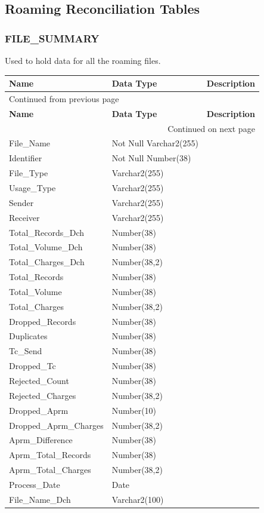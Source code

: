 \documentclass[12pt,twoside]{article}
\begin{document}
\normalsize

\subsection{Roaming Reconciliation Tables}
\label{sec:orgheadline161}
\subsubsection{FILE\_SUMMARY}
\label{sec:orgheadline158}
Used to hold data for all the roaming files.
\footnotesize
\begin{longtable}{l|l|l}
\hline
\textbf{Name} & \textbf{Data Type} & \textbf{Description}\\
\hline
\endfirsthead
\multicolumn{3}{l}{Continued from previous page} \\
\hline

\textbf{Name} & \textbf{Data Type} & \textbf{Description} \\

\hline
\endhead
\hline\multicolumn{3}{r}{Continued on next page} \\
\endfoot
\endlastfoot
\hline
File\_Name & Not Null Varchar2(255) & \\
Identifier & Not Null Number(38) & \\
File\_Type & Varchar2(255) & \\
Usage\_Type & Varchar2(255) & \\
Sender & Varchar2(255) & \\
Receiver & Varchar2(255) & \\
Total\_Records\_Dch & Number(38) & \\
Total\_Volume\_Dch & Number(38) & \\
Total\_Charges\_Dch & Number(38,2) & \\
Total\_Records & Number(38) & \\
Total\_Volume & Number(38) & \\
Total\_Charges & Number(38,2) & \\
Dropped\_Records & Number(38) & \\
Duplicates & Number(38) & \\
Tc\_Send & Number(38) & \\
Dropped\_Tc & Number(38) & \\
Rejected\_Count & Number(38) & \\
Rejected\_Charges & Number(38,2) & \\
Dropped\_Aprm & Number(10) & \\
Dropped\_Aprm\_Charges & Number(38,2) & \\
Aprm\_Difference & Number(38) & \\
Aprm\_Total\_Records & Number(38) & \\
Aprm\_Total\_Charges & Number(38,2) & \\
Process\_Date & Date & \\
File\_Name\_Dch & Varchar2(100) & \\
\hline
\end{longtable}
\end{document}
